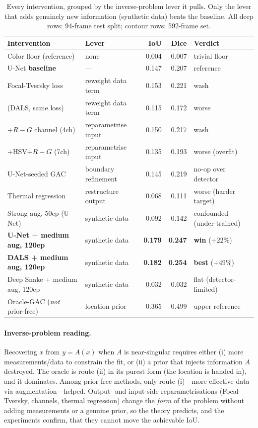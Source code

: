 \documentclass[10pt]{article}
\begin{document}
\begin{table}[H]
\centering\small
\begin{tabular}{llrrl}
\toprule
Intervention & Lever & IoU & Dice & Verdict \\
\midrule
Color floor (reference) & none & 0.004 & 0.007 & trivial floor \\
U-Net \textbf{baseline} & --- & 0.147 & 0.207 & reference \\
Focal-Tversky loss & reweight data term & 0.153 & 0.221 & wash \\
\quad (DALS, same loss) & reweight data term & 0.115 & 0.172 & worse \\
$+R\!-\!G$ channel (4ch) & reparametrise input & 0.150 & 0.217 & wash \\
$+$HSV$+R\!-\!G$ (7ch) & reparametrise input & 0.135 & 0.193 & worse (overfit) \\
U-Net-seeded GAC & boundary refinement & 0.145 & 0.219 & no-op over detector \\
Thermal regression & restructure output & 0.068 & 0.111 & worse (harder target) \\
Strong aug, 50ep (U-Net) & synthetic data & 0.092 & 0.142 & confounded (under-trained) \\
\textbf{U-Net + medium aug, 120ep} & synthetic data & \textbf{0.179} & \textbf{0.247} & \textbf{win} ($+22\%$) \\
\textbf{DALS + medium aug, 120ep} & synthetic data & \textbf{0.182} & \textbf{0.254} & \textbf{best} ($+49\%$) \\
Deep Snake + medium aug, 120ep & synthetic data & 0.032 & 0.032 & flat (detector-limited) \\
\midrule
Oracle-GAC (\emph{not} prior-free) & location prior & 0.365 & 0.499 & upper reference \\
\bottomrule
\end{tabular}
\caption{Every intervention, grouped by the inverse-problem lever it pulls.
Only the lever that adds genuinely new information (synthetic data) beats the
baseline. All deep rows: 94-frame test split; contour rows: 592-frame set.}
\label{tab:all}
\end{table}

\paragraph{Inverse-problem reading.} Recovering $x$ from $y=A(x)$ when $A$ is
near-singular requires either (i) more measurements/data to constrain the fit,
or (ii) a prior that injects information $A$ destroyed. The oracle is route (ii)
in its purest form (the location is handed in), and it dominates. Among prior-free
methods, only route (i)---more effective data via augmentation---helped. Output-
and input-side reparametrisations (Focal-Tversky, channels, thermal regression)
change the \emph{form} of the problem without adding measurements or a genuine
prior, so the theory predicts, and the experiments confirm, that they cannot move
the achievable IoU.
\end{document}
